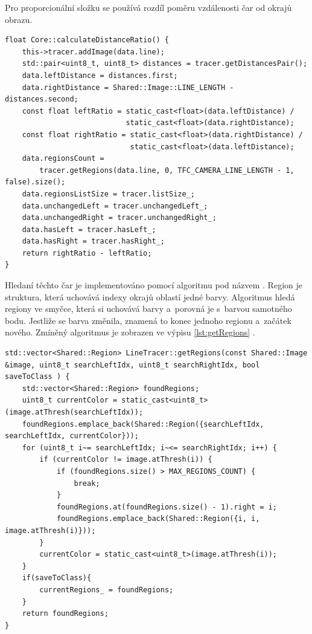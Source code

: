 Pro proporcionální složku se používá rozdíl poměru vzdálenosti čar od okrajů obrazu.
\begin{lstlisting}[caption = Kalkulace poměru vzdálenosti čar, label = lst:calculateDistanceRatio]
float Core::calculateDistanceRatio() {
    this->tracer.addImage(data.line);
    std::pair<uint8_t, uint8_t> distances = tracer.getDistancesPair();
    data.leftDistance = distances.first;
    data.rightDistance = Shared::Image::LINE_LENGTH - distances.second;
    const float leftRatio = static_cast<float>(data.leftDistance) /
                            static_cast<float>(data.rightDistance);
    const float rightRatio = static_cast<float>(data.rightDistance) /
                             static_cast<float>(data.leftDistance);
    data.regionsCount =
        tracer.getRegions(data.line, 0, TFC_CAMERA_LINE_LENGTH - 1, false).size();
    data.regionsListSize = tracer.listSize_;
    data.unchangedLeft = tracer.unchangedLeft_;
    data.unchangedRight = tracer.unchangedRight_;
    data.hasLeft = tracer.hasLeft_;
    data.hasRight = tracer.hasRight_;
    return rightRatio - leftRatio;
}
\end{lstlisting}

Hledaní těchto čar je implementováno pomocí algoritmu pod názvem . Region je struktura, která uchovává indexy okrajů oblastí jedné barvy.
Algoritmus hledá regiony ve smyčce, která si uchovává barvy a~porovná je s~barvou
samotného bodu. Jestliže se barva změnila, znamená to konec jednoho regionu
a~začátek nového. Zmíněný algoritmus je zobrazen ve výpisu \ref{lst:getRegions} 
\cite{robot}.

\begin{lstlisting}[caption = Algoritmus \uv{Hledání Regionu}, label = lst:getRegions]
std::vector<Shared::Region> LineTracer::getRegions(const Shared::Image &image, uint8_t searchLeftIdx, uint8_t searchRightIdx, bool saveToClass ) {
	std::vector<Shared::Region> foundRegions;
	uint8_t currentColor = static_cast<uint8_t>(image.atThresh(searchLeftIdx));
	foundRegions.emplace_back(Shared::Region({searchLeftIdx, searchLeftIdx, currentColor}));
	for (uint8_t i~= searchLeftIdx; i~<= searchRightIdx; i++) {
		if (currentColor != image.atThresh(i)) {
			if (foundRegions.size() > MAX_REGIONS_COUNT) {
				break;
			}
			foundRegions.at(foundRegions.size() - 1).right = i;
			foundRegions.emplace_back(Shared::Region({i, i, image.atThresh(i)}));
		}
		currentColor = static_cast<uint8_t>(image.atThresh(i));
	}
	if(saveToClass){
		currentRegions_ = foundRegions;
	}
	return foundRegions;
}
\end{lstlisting}

